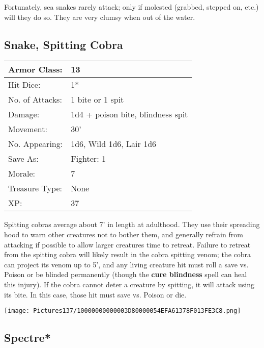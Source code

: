 \documentclass[a4paper,twoside,openany,10pt]{book}
\begin{document}
\begin{multicols}{2}
Fortunately, sea snakes rarely attack; only if molested (grabbed, stepped on, etc.) will they do so. They are very clumsy when out of the water.

\subsection*{Snake, Spitting Cobra}\label{snake-spitting-cobra}

\begin{tabularx}{0.50\textwidth}{@{}lX@{}}
Armor Class: & 13 \\\hline
Hit Dice: & 1* \\\hline
No. of Attacks: & 1 bite or 1 spit \\\hline
Damage: & 1d4 + poison bite, blindness spit \\\hline
Movement: & 30' \\\hline
No. Appearing: & 1d6, Wild 1d6, Lair 1d6 \\\hline
Save As: & Fighter: 1 \\\hline
Morale: & 7 \\\hline
Treasure Type: & None \\\hline
XP: & 37 \\\hline
\end{tabularx}\medskip

Spitting cobras average about 7' in length at adulthood. They use their spreading hood to warn other creatures not to bother them, and generally refrain from attacking if possible to allow larger creatures time to retreat. Failure to retreat from the spitting cobra will likely result in the cobra spitting venom; the cobra can project its venom up to 5', and any living creature hit must roll a save vs. Poison or be blinded permanently (though the \textbf{cure blindness} spell can heal this injury). If the cobra cannot deter a creature by spitting, it will attack using its bite. In this case, those hit must save vs. Poison or die.

\vfill

\begin{center} \texttt{[image: Pictures137/10000000000003D80000054EFA61378F013FE3C8.png]} \end{center}

\columnbreak


\subsection*{Spectre*}\label{spectre}


\end{multicols}
\end{document}
